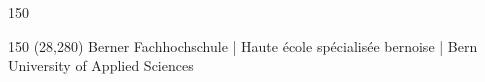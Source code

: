 \begin{titlepage}
\begin{flushleft}
\begin{textblock}{150}
\end{textblock}
\end{flushleft}

\begin{textblock}{150} (28,280)
\noindent 
\color{bfhgrey}\fontsize{9pt}{10pt}\selectfont
Berner Fachhochschule | Haute école spécialisée bernoise | Bern University of Applied Sciences
\color{black}\selectfont
\end{textblock}


\end{titlepage}

